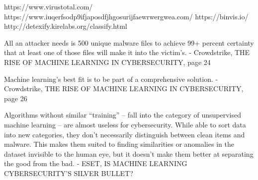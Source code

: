https://www.virustotal.com/
https://www.iuqerfsodp9ifjaposdfjhgosurijfaewrwergwea.com/
https://binvis.io/
http://detexify.kirelabs.org/classify.html

All an attacker needs is 500 unique malware files to achieve 99+ percent certainty that at least one of those files will make it into the victim’s.
- Crowdstrike, THE RISE OF MACHINE LEARNING IN CYBERSECURITY, page 24

Machine learning’s best fit is to be part of a comprehensive solution.
- Crowdstrike, THE RISE OF MACHINE LEARNING IN CYBERSECURITY, page 26

Algorithms without similar “training” – fall into the category of unsupervised machine learning – are almost useless for cybersecurity. While able to sort data into new categories, they don’t necessarily distinguish between clean items and malware. This makes them suited to finding similarities or anomalies in the dataset invisible to the human eye, but it doesn’t make them better at separating the good from the bad.
- ESET, IS MACHINE LEARNING CYBERSECURITY’S SILVER BULLET?

